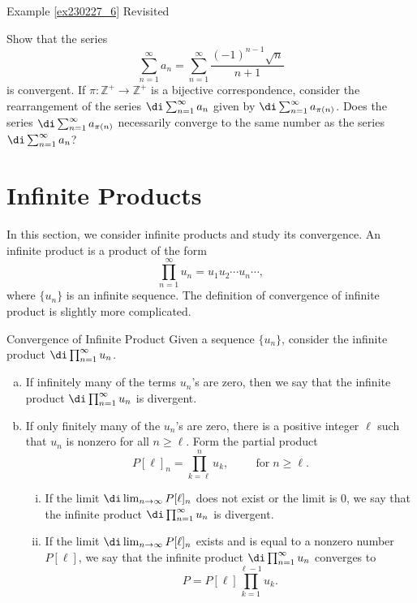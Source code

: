\begin{example}{\linkt Example \ref{ex230227_6} Revisited}
\begin{example}[label=ex230227_13]{}
\begin{question}{\themyquestion}
 \end{question}
 \atc
 \begin{question}{\themyquestion}Show that the  series \[\sum_{n=1}^{\infty}a_n=\sum_{n=1}^{\infty}\frac{(-1)^{n-1}\sqrt{n}}{n+1}\] is convergent. 
 If $\pi:\mathbb{Z}^+\to\mathbb{Z}^+$ is a bijective correspondence,   consider the rearrangement of the series $\di\sum_{n=1}^{\infty}a_{n}$ given by $\di\sum_{n=1}^{\infty}a_{\pi(n)}$. Does the series  $\di\sum_{n=1}^{\infty}a_{\pi(n)}$ necessarily converge to the same number as the series $\di\sum_{n=1}^{\infty}a_{n}$? 
  
 \end{question}
 
  
\vp




\section{Infinite Products}\label{sec5.4}

In this section, we consider infinite products and study its convergence. An infinite product is a product of the form
\[\prod_{n=1}^{\infty}u_n=u_1u_2\cdots u_n\cdots,\]
where $\{u_n\}$ is an infinite sequence. The definition of convergence of infinite product is slightly more complicated.

\begin{definition}{Convergence of Infinite Product} 
Given a sequence $\{u_n\}$, consider the infinite product
$\di \prod_{n=1}^{\infty}u_n$.
\begin{enumerate}[(a)]
\item
If infinitely many of the terms $u_n$'s are zero, then we say that the infinite product $\di \prod_{n=1}^{\infty}u_n$ is divergent.
\item If only finitely many of the $u_n$'s are zero, there is a positive integer $\ell$ such that $u_n$ is nonzero for all $n\geq \ell$. Form the partial product
\[P[\ell]_{n}=\prod_{k=\ell}^nu_k,\hspace{1cm}\text{for}\;n\geq \ell.\]
 
 
\begin{enumerate}[(i)]
\item If the limit $\di \lim_{n\rightarrow \infty}P[\ell]_{n}$ does not exist or the limit is 0, we say that the infinite product $\di \prod_{n=1}^{\infty}u_n$ is divergent.
\item If the limit  $\di \lim_{n\rightarrow \infty}P[\ell]_{n}$ exists and is equal to a nonzero number $P[\ell]$, we say that  the infinite product $\di \prod_{n=1}^{\infty}u_n$ converges to
\[P=P[\ell]\prod_{k=1}^{\ell-1}u_k.\]
 


\end{enumerate}
\end{enumerate}
\end{definition}
\end{example}
\end{example}
